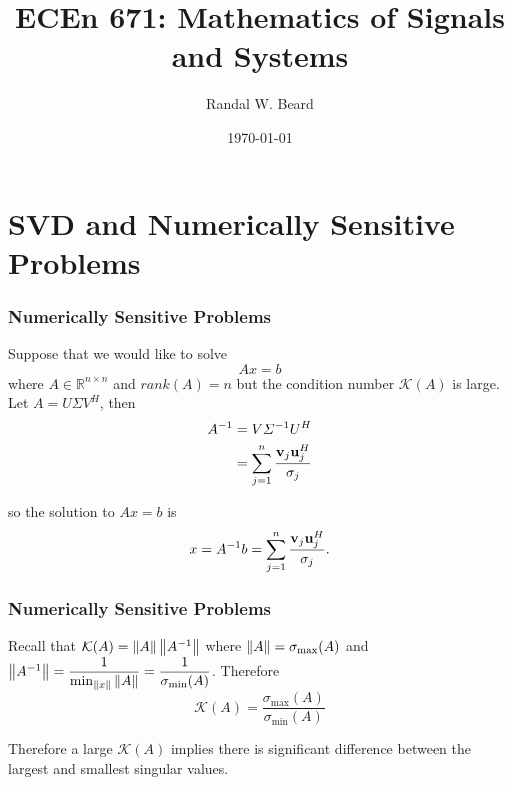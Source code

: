\documentclass{beamer}
\title{ECEn 671: Mathematics of Signals and Systems}
\author{Randal W. Beard}
\institute{Brigham Young University}
\date{\today}
\begin{document}
\begin{frame}
	\titlepage
\end{frame}


\section{SVD and Numerically Sensitive Problems}
\frame{\sectionpage}

\begin{frame}\frametitle{Numerically Sensitive Problems}
	Suppose that we would like to solve
	\[ 
		Ax = b  
	\]
	where $A \in \mathbb{R}^{n\times n}$ and $rank(A) = n$ but the condition number $\mathcal{K}(A)$ is large.  Let $A= U\Sigma V^H$, then 
	\begin{align*}
		 A^{-1} 
		 	&= V\Sigma^{-1} U^H\\
			&= \sum_{j=1}^{n}\frac{\mathbf{v}_j \mathbf{u}_j^H}{\sigma_j}
	\end{align*}
	
	so the solution to $Ax = b$ is
	\[ 
		x = A^{-1}b 
		  = \sum_{j=1}^{n}\frac{\mathbf{v}_j \mathbf{u}_j^H}{\sigma_j}.
	\]	
\end{frame}

\begin{frame}\frametitle{Numerically Sensitive Problems}
	Recall that 
	$\mathcal{K}(A) = \left\|A\right\|\left\|A^{-1}\right\|$ 
	where 
	$\left\|A\right\| = \sigma_{\max}(A)$ 
	and 
	$\left\|A^{-1} \right\| = \displaystyle\frac{1}{\min_{\left\|x\right\|}\left\|A\right\|} = \frac{1}{\sigma_{\min}(A)}$. 
		Therefore
	\[
		\mathcal{K}(A) = \frac{\sigma_{\max}(A)}{\sigma_{\min}(A)}
	\]
	
	\vfill
	
	Therefore a large $\mathcal{K}(A)$ implies there is significant difference between the largest and smallest singular values.	
\end{frame}
\end{document}
